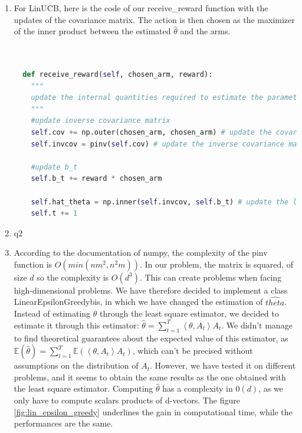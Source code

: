 \begin{enumerate}
    \item For LinUCB, here is the code of our receive\_reward function with the updates of the covariance matrix. The action is then chosen as the maximizer of the inner product between the estimated $\hat{\theta}$ and the arms.

    \begin{lstlisting}[language=Python]

        
  def receive_reward(self, chosen_arm, reward):
    """
    update the internal quantities required to estimate the parameter theta using least squares
    """
    #update inverse covariance matrix
    self.cov += np.outer(chosen_arm, chosen_arm) # update the covariance matrix
    self.invcov = pinv(self.cov) # update the inverse covariance matrix

    #update b_t
    self.b_t += reward * chosen_arm

    self.hat_theta = np.inner(self.invcov, self.b_t) # update the least square estimate
    self.t += 1
    \end{lstlisting}


        
    \item q2
    \item According to the documentation of numpy, the complexity of the pinv function is $O(min(n m^2, n^2m))$. In our problem, the matrix is squared, of size $d$ so the complexity is $O(d^3)$.
This can create problems when facing high-dimensional problems. We have therefore decided to implement a class LinearEpsilonGreedybis, in which we have changed the estimation of $\hat{theta}$. 
Instead of estimating $\theta$ through the least square estimator, we decided to estimate it through this estimator: $\hat{\theta} = \sum_{t=1}^{T} \left\langle \theta , A_t\right\rangle A_t$. 
We didn't manage to find theoretical guarantees about the expected value of this estimator, as $\mathbb{E}(\hat{\theta}) = \sum_{t=1}^{T} \mathbb{E} ( \left\langle \theta , A_t\right\rangle A_t) $, which can't be precised without assumptions on the distribution of $A_t$.
However, we have tested it on different problems, and it seems to obtain the same results as the one obtained with the least square estimator.
Computing $\hat{\theta}$ has a complexity in $0(d)$, as we only have to compute scalars products of d-vectors. The figure \ref{fig:lin_epsilon_greedy} underlines the gain in computational time, while the performances are the same.


\end{enumerate}
